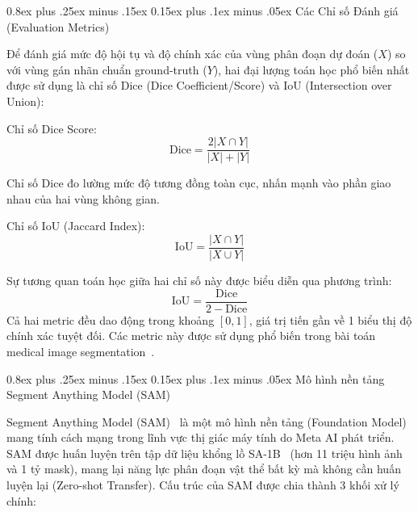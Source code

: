 \documentclass[conference]{IEEEtran}
\makeatletter
\def\subsection{\@startsection{subsection}{2}{\z@}%
  {0.8ex plus .25ex minus .15ex}%
  {0.15ex plus .1ex minus .05ex}%
  {\reset@font\normalsize\itshape}}%
\makeatother
\begin{document}
\subsection{Các Chỉ số Đánh giá (Evaluation Metrics)}

Để đánh giá mức độ hội tụ và độ chính xác của vùng phân đoạn dự đoán ($X$) so với vùng gán nhãn chuẩn ground-truth ($Y$), hai đại lượng toán học phổ biến nhất được sử dụng là chỉ số Dice (Dice Coefficient/Score) và IoU (Intersection over Union):

Chỉ số Dice Score:
\begin{equation}
\mathrm{Dice} = \frac{2|X \cap Y|}{|X| + |Y|}
\end{equation}

Chỉ số Dice đo lường mức độ tương đồng toàn cục, nhấn mạnh vào phần giao nhau của hai vùng không gian.

Chỉ số IoU (Jaccard Index):
\begin{equation}
\mathrm{IoU} = \frac{|X \cap Y|}{|X \cup Y|}
\end{equation}

Sự tương quan toán học giữa hai chỉ số này được biểu diễn qua phương trình:
\begin{equation}
\mathrm{IoU} = \frac{\mathrm{Dice}}{2 - \mathrm{Dice}}
\end{equation}
Cả hai metric đều dao động trong khoảng $[0, 1]$, giá trị tiến gần về 1 biểu thị độ chính xác tuyệt đối. Các metric này được sử dụng phổ biến trong bài toán medical image segmentation~\cite{ref5,ref6}.

\subsection{Mô hình nền tảng Segment Anything Model (SAM)}

Segment Anything Model (SAM)~\cite{ref2,ref4} là một mô hình nền tảng (Foundation Model) mang tính cách mạng trong lĩnh vực thị giác máy tính do Meta AI phát triển. SAM được huấn luyện trên tập dữ liệu khổng lồ SA-1B~\cite{ref4} (hơn 11 triệu hình ảnh và 1 tỷ mask), mang lại năng lực phân đoạn vật thể bất kỳ mà không cần huấn luyện lại (Zero-shot Transfer). Cấu trúc của SAM được chia thành 3 khối xử lý chính:
\end{document}
